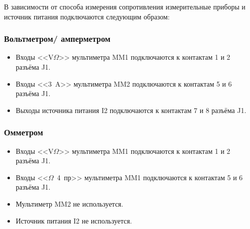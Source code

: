 В зависимости от способа измерения сопротивления измерительные приборы и источник питания подключаются следующим образом:

\subsubsection{Вольтметром/ амперметром}

    \begin{itemize}
        \item Входы <<V$\Omega$>> мультиметра MM1 подключаются к контактам 1 и 2 разъёма J1. 
        \item Входы <<3~A>> мультиметра MM2 подключаются к контактам 5 и 6 разъёма J1. 
        \item Выходы источника питания I2 подключаются к контактам 7 и 8 разъёма J1. 
    \end{itemize}
        
\subsubsection{Омметром}

    \begin{itemize}
        \item Входы <<V$\Omega$>> мультиметра MM1 подключаются к контактам 1 и 2 разъёма J1. 
        \item Входы <<$\Omega$~4~пр>> мультиметра MM1 подключаются к контактам 5 и 6 разъёма J1. 
        \item Мультиметр MM2 не используется. 
        \item Источник питания I2 не используется. 
    \end{itemize}
